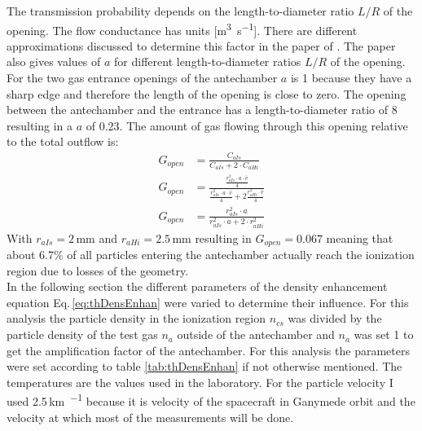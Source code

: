 		The transmission probability depends on the length-to-diameter ratio $L/R$ of the opening. The flow conductance has units [\si{\cubic\meter\per\second}]. There are different approximations discussed to determine this factor in the paper of \cite{molFlowTubeTransm_Essen1976}. The paper also gives values of $a$ for different length-to-diameter ratios $L/R$ of the opening. For the two gas entrance openings of the antechamber $a$ is 1 because they have a sharp edge and therefore the length of the opening is close to zero. The opening between the antechamber and the entrance has a length-to-diameter ratio of 8 resulting in a $a$ of 0.23.	The amount of gas flowing through this opening relative to the total outflow is:
		\begin{align}
			G_{open} & = \frac{C_{aIs}}{C_{aIs} + 2\cdot C_{aHi}} \label{eq:GAntOpen}\\
			G_{open} & = \frac{\frac{r_{aIs}^2\cdot a\cdot \bar{v}}{4}}{\frac{r_{aIs}^2\cdot a\cdot \bar{v}}{4} + 2\frac{r_{aHi}^2\cdot \bar{v}}{4}}\\
			G_{open} &= \frac{r_{aIs}^2\cdot a}{r_{aIs}^2\cdot a + 2\cdot r_{aHi}^2}
		\end{align}
		With $r_{aIs} = 2\,\si{\milli\meter}$ and $r_{aHi} = 2.5\,\si{\milli\meter}$ resulting in $G_{open} = 0.067$ meaning that about 6.7\% of all particles entering the antechamber actually reach the ionization region due to losses of the geometry.\\
		In the following section the different parameters of the density enhancement equation Eq.\,\eqref{eq:thDensEnhan} were varied to determine their influence. For this analysis the particle density in the ionization region $n_{cs}$ was divided by the particle density of the test gas $n_a$ outside of the antechamber and $n_a$ was set 1 to get the amplification factor of the antechamber. For this analysis the parameters were set according to table \ref{tab:thDensEnhan} if not otherwise mentioned. The temperatures are the values used in the laboratory. For the particle velocity I used 2.5\,\si{\kilo\meter\per\sec} because it is velocity of the spacecraft in Ganymede orbit and the velocity at which most of the measurements will be done.\\
				
